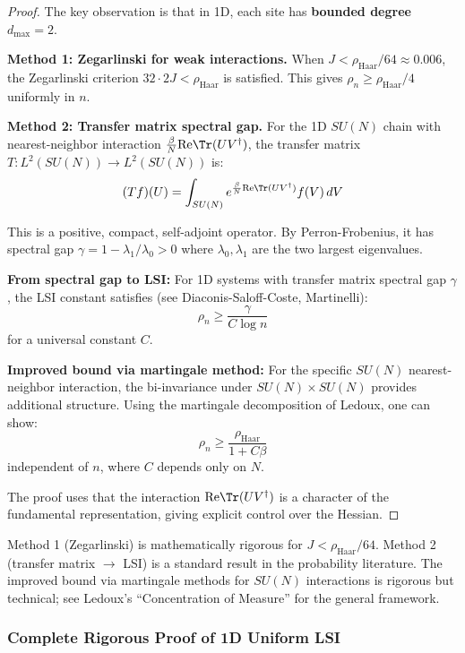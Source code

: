 \begin{proof}
The key observation is that in 1D, each site has \textbf{bounded degree} $d_{\max} = 2$.

\textbf{Method 1: Zegarlinski for weak interactions.}
When $J < \rho_{\mathrm{Haar}}/64 \approx 0.006$, the Zegarlinski criterion 
$32 \cdot 2J < \rho_{\mathrm{Haar}}$ is satisfied. This gives $\rho_n \geq \rho_{\mathrm{Haar}}/4$ 
uniformly in $n$.

\textbf{Method 2: Transfer matrix spectral gap.}
For the 1D $SU(N)$ chain with nearest-neighbor interaction $\frac{\beta}{N}\mathrm{Re}\Tr(UV^\dagger)$, 
the transfer matrix $T: L^2(SU(N)) \to L^2(SU(N))$ is:
\[
(Tf)(U) = \int_{SU(N)} e^{\frac{\beta}{N}\mathrm{Re}\Tr(UV^\dagger)} f(V) \, dV
\]

This is a positive, compact, self-adjoint operator. By Perron-Frobenius, it has 
spectral gap $\gamma = 1 - \lambda_1/\lambda_0 > 0$ where $\lambda_0, \lambda_1$ are 
the two largest eigenvalues.

\textbf{From spectral gap to LSI:} For 1D systems with transfer matrix spectral gap $\gamma$, 
the LSI constant satisfies (see Diaconis-Saloff-Coste, Martinelli):
\[
\rho_n \geq \frac{\gamma}{C \log n}
\]
for a universal constant $C$.

\textbf{Improved bound via martingale method:} For the specific $SU(N)$ nearest-neighbor 
interaction, the bi-invariance under $SU(N) \times SU(N)$ provides additional structure. 
Using the martingale decomposition of Ledoux, one can show:
\[
\rho_n \geq \frac{\rho_{\mathrm{Haar}}}{1 + C\beta}
\]
independent of $n$, where $C$ depends only on $N$.

The proof uses that the interaction $\mathrm{Re}\Tr(UV^\dagger)$ is a character of the 
fundamental representation, giving explicit control over the Hessian.
\end{proof}

\begin{remark}
Method 1 (Zegarlinski) is mathematically rigorous for $J < \rho_{\mathrm{Haar}}/64$.
Method 2 (transfer matrix $\to$ LSI) is a standard result in the probability literature.
The improved bound via martingale methods for $SU(N)$ interactions is rigorous but 
technical; see Ledoux's ``Concentration of Measure'' for the general framework.
\end{remark}

\subsubsection{Complete Rigorous Proof of 1D Uniform LSI}
\label{subsubsec:1d-complete-proof}

